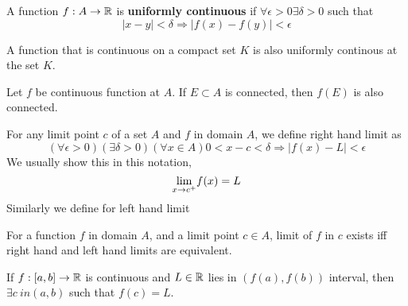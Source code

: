 \begin{definition}
    A function $f:A \to {\mathbb{R}}$ is \textbf{uniformly continuous} if $\forall \epsilon >0 \exists \delta >0$ such that
    \[ |x-y| < \delta \Rightarrow |f(x) -f(y)| < \epsilon\]
\end{definition}
\begin{theorem} A function that is continuous on a compact set $K$ is also uniformly continous at the set $K$.
\end{theorem}

\begin{theorem} Let $f$ be continuous function at $A$. If $E \subset A$ is connected, then $f(E)$ is also connected.
\end{theorem}

\begin{definition} For any limit point $c$ of a set $A$ and $f$ in domain $A$, we define right hand limit as
    \[ (\forall \epsilon >0) (\exists \delta > 0)(\forall x \in A) 0 < x-c < \delta \Rightarrow |f(x) - L| < \epsilon\]
    We usually show this in this notation,
    \[ \underset{x \to c^{+}}{\lim} f(x) = L\]
    Similarly we define for left hand limit
\end{definition}

\begin{theorem} For a function $f$ in domain $A$, and a limit point $c \in A$, limit of $f$ in $c$ exists iff  right hand and left hand limits are equivalent.
\end{theorem}



\begin{theorem} If $f: [a,b] \to {\mathbb{R}}$ is continuous and $L \in {\mathbb{R}}$ lies in $(f(a), f(b))$ interval, then $\exists c\ in (a,b)$ such that $f(c) = L$.
\end{theorem}


